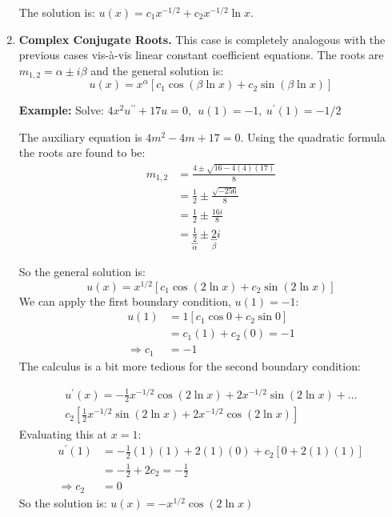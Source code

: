 \begin{enumerate}
The solution is: $u(x)=c_1x^{-1/2}+c_2x^{-1/2}\ln{x}$.

\vspace{0.5cm}

\item \textbf{Complex Conjugate Roots.}  This case is completely analogous with the previous cases vis-\`a-vis linear constant coefficient equations.  The roots are $m_{1,2} = \alpha \pm i\beta$ and the general solution is:
\begin{equation}
u(x) = x^{\alpha}\left[c_1 \cos{(\beta \ln{x})} + c_2 \sin{(\beta \ln{x})} \right]
\end{equation}

\vspace{0.5cm}

\noindent\textbf{Example:} Solve: $4x^2 u^{\prime \prime} +17u=0, \ \ u(1)=-1, \ u^{\prime}(1)=-1/2$

\vspace{0.25cm}

\noindent The auxiliary equation is $4m^2-4m+17=0$.  Using the quadratic formula the roots are found to be: 
\begin{align*}
m_{1,2} &= \frac{4 \pm \sqrt{16-4(4)(17)}}{8} \\
&=\frac{1}{2} \pm \frac{\sqrt{-256}}{8} \\
&=\frac{1}{2} \pm \frac{16i}{8} \\
&=\underbracket{\frac{1}{2}}_{\alpha} \pm \underbracket{2}_{\beta}i
\end{align*}

\noindent So the general solution is:
\begin{equation*}
u(x)=x^{1/2}\left[c_1 \cos{(2 \ln{x})}+c_2 \sin{(2 \ln{x})} \right]
\end{equation*}
We can apply the first boundary condition, $u(1)=-1$:
\begin{align*}
u(1) &= 1 \left[c_1 \cos{0} + c_2 \sin{0} \right] \\
&= c_1(1) + c_2(0) = -1 \\
\Rightarrow c_1&=-1
\end{align*}
The calculus is a bit more tedious for the second boundary condition:

\begin{multline*}
u^{\prime}(x) = -\frac{1}{2}x^{-1/2}\cos{(2 \ln{x})} + 2x^{-1/2}\sin{(2 \ln{x})} + ...\\
c_2\left[ \frac{1}{2} x^{-1/2} \sin{(2 \ln{x})} + 2x^{-1/2}\cos{(2 \ln{x})} \right]
\end{multline*}
Evaluating this at $x=1$:
\begin{align*}
u^{\prime}(1)&=-\frac{1}{2}(1)(1)+2(1)(0)+c_2[0+2(1)(1)] \\
&=-\frac{1}{2}+2c_2 = -\frac{1}{2} \\
\Rightarrow c_2&=0
\end{align*}
So the solution is: $u(x) = -x^{1/2}\cos{(2 \ln{x})}$

\end{enumerate}

